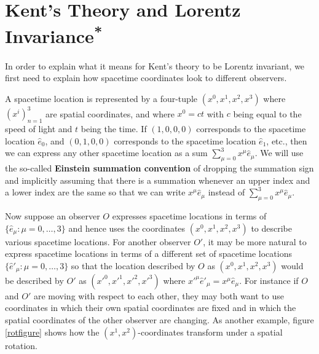 \section{Kent's Theory and Lorentz Invariance\label{LorentzInvariance}\textsuperscript{*}}
In order to explain what it means for Kent's theory to be Lorentz invariant, we first need to explain how spacetime coordinates look to different observers. 

A spacetime location is represented by a four-tuple $(x^0, x^1, x^2, x^3)$ where $(x^i)_{n=1}^3$ are spatial coordinates, and where $x^0=ct$ with $c$ being equal to the speed of light and $t$ being the time. If $(1,0,0,0)$ corresponds to the spacetime location $\hat{e}_0$, and $(0,1,0,0)$ corresponds to the spacetime location $\hat{e}_1$, etc., then we can express any other spacetime location  as a sum $\sum_{\mu=0}^3x^\mu\hat{e}_\mu$. We will use the so-called \textbf{Einstein summation convention}\label{Einsteinsum} of dropping the summation sign and implicitly assuming that there is a summation whenever an upper index and a lower index are the same so that we can write $x^\mu\hat{e}_\mu$ instead of $\sum_{\mu=0}^3x^\mu\hat{e}_\mu$.  

Now suppose an observer $O$ expresses spacetime locations in terms of $\{\hat{e}_\mu:\mu=0,\ldots,3\}$ and hence uses the coordinates $(x^0, x^1, x^2, x^3)$ to describe various spacetime locations. For another observer $O'$, it may be more natural to express spacetime locations in terms of a different set of spacetime locations $\{\hat{e}'_\mu:\mu=0,\ldots,3\}$ so that the location described by $O$ as $(x^0, x^1, x^2, x^3)$ would be described by $O'$ as $({x'}^0, {x'}^1, {x'}^2, {x'}^3)$ where ${x'}^\mu{\hat{e}'}_\mu=x^\mu\hat{e}_\mu$.  For instance if $O$ and $O'$ are moving with respect to each other, they may both want to use coordinates in which their own spatial coordinates are fixed and in which the spatial coordinates of the other observer are changing. As another example, figure \ref{rotfigure} shows how the $(x^1, x^2)$-coordinates transform under a spatial rotation. 


